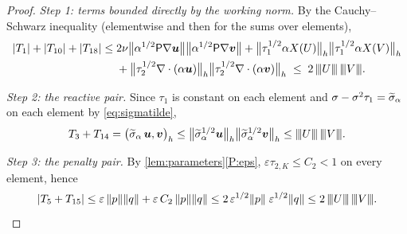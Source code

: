 \begin{proof}
\medskip\noindent\emph{Step 1: terms bounded directly by the working norm.}
By the Cauchy--Schwarz inequality (elementwise and then for the sums over elements),
\begin{align}
  |T_1| + |T_{10}| + |T_{18}|
  \le{}& 2\nu\bigl\lVert\alpha^{1/2}\mathsf{P}\nabla\boldsymbol{u}\bigr\rVert
        \bigl\lVert\alpha^{1/2}\mathsf{P}\nabla\boldsymbol{v}\bigr\rVert
  + \bigl\lVert\tau_1^{1/2}\alpha X(U)\bigr\rVert_h
        \bigl\lVert\tau_1^{1/2}\alpha X(V)\bigr\rVert_h \nonumber\\
  &+ \bigl\lVert\tau_2^{1/2}\nabla\cdot(\alpha\boldsymbol{u})\bigr\rVert_h
        \bigl\lVert\tau_2^{1/2}\nabla\cdot(\alpha\boldsymbol{v})\bigr\rVert_h
  \;\le\; 2\,{\lvert\kern-0.25ex\lvert\kern-0.25ex\lvert U \rvert\kern-0.25ex\rvert\kern-0.25ex\rvert}\,{\lvert\kern-0.25ex\lvert\kern-0.25ex\lvert V \rvert\kern-0.25ex\rvert\kern-0.25ex\rvert}.
  \label{eq:easystep}
\end{align}

\medskip\noindent\emph{Step 2: the reactive pair.}
Since $\tau_1$ is constant on each element and
$\sigma-\sigma^2\tau_{1}=\widetilde{\sigma}_{\alpha}$ on each element by \eqref{eq:sigmatilde},
\begin{equation}\label{eq:reactivestep}
  T_3 + T_{14} = \bigl(\widetilde{\sigma}_{\alpha}\,\boldsymbol{u},\boldsymbol{v}\bigr)_h
  \le \bigl\lVert\widetilde{\sigma}_{\alpha}^{1/2}\boldsymbol{u}\bigr\rVert_h
      \bigl\lVert\widetilde{\sigma}_{\alpha}^{1/2}\boldsymbol{v}\bigr\rVert_h
  \le {\lvert\kern-0.25ex\lvert\kern-0.25ex\lvert U \rvert\kern-0.25ex\rvert\kern-0.25ex\rvert}\,{\lvert\kern-0.25ex\lvert\kern-0.25ex\lvert V \rvert\kern-0.25ex\rvert\kern-0.25ex\rvert}.
\end{equation}

\medskip\noindent\emph{Step 3: the penalty pair.}
By \cref{lem:parameters}\ref{P:eps}, $\varepsilon\tau_{2,K}\le C_2<1$ on every element,
hence
\begin{equation}\label{eq:penaltystep}
  |T_5 + T_{15}|
  \le \varepsilon\,\lVert p\rVert\lVert q\rVert + \varepsilon\,C_2\,\lVert p\rVert\lVert q\rVert
  \le 2\,\varepsilon^{1/2}\lVert p\rVert\;\varepsilon^{1/2}\lVert q\rVert
  \le 2\,{\lvert\kern-0.25ex\lvert\kern-0.25ex\lvert U \rvert\kern-0.25ex\rvert\kern-0.25ex\rvert}\,{\lvert\kern-0.25ex\lvert\kern-0.25ex\lvert V \rvert\kern-0.25ex\rvert\kern-0.25ex\rvert}.
\end{equation}


\end{proof}
